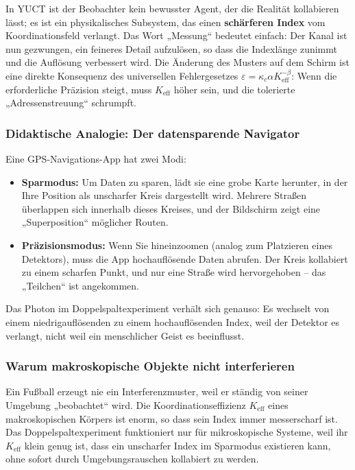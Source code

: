 \documentclass[12pt,a4paper]{article}
\theoremstyle{remark}
\begin{document}
	In YUCT ist der Beobachter kein bewusster Agent, der die Realität kollabieren lässt; es ist ein physikalisches Subsystem, das einen \textbf{schärferen Index} vom Koordinationsfeld verlangt. Das Wort „Messung“ bedeutet einfach: Der Kanal ist nun gezwungen, ein feineres Detail aufzulösen, so dass die Indexlänge zunimmt und die Auflösung verbessert wird. Die Änderung des Musters auf dem Schirm ist eine direkte Konsequenz des universellen Fehlergesetzes $\varepsilon = \kappa_c \alpha K_{\mathrm{eff}}^{-\beta}$: Wenn die erforderliche Präzision steigt, muss $K_{\mathrm{eff}}$ höher sein, und die tolerierte „Adressenstreuung“ schrumpft.
	
	\subsubsection{Didaktische Analogie: Der datensparende Navigator}
	
	Eine GPS-Navigations-App hat zwei Modi:
	\begin{itemize}
		\item \textbf{Sparmodus:} Um Daten zu sparen, lädt sie eine grobe Karte herunter, in der Ihre Position als unscharfer Kreis dargestellt wird. Mehrere Straßen überlappen sich innerhalb dieses Kreises, und der Bildschirm zeigt eine „Superposition“ möglicher Routen.
		\item \textbf{Präzisionsmodus:} Wenn Sie hineinzoomen (analog zum Platzieren eines Detektors), muss die App hochauflösende Daten abrufen. Der Kreis kollabiert zu einem scharfen Punkt, und nur eine Straße wird hervorgehoben – das „Teilchen“ ist angekommen.
	\end{itemize}
	Das Photon im Doppelspaltexperiment verhält sich genauso: Es wechselt von einem niedrigauflösenden zu einem hochauflösenden Index, weil der Detektor es verlangt, nicht weil ein menschlicher Geist es beeinflusst.
	
	\subsubsection{Warum makroskopische Objekte nicht interferieren}
	
	Ein Fußball erzeugt nie ein Interferenzmuster, weil er ständig von seiner Umgebung „beobachtet“ wird. Die Koordinationseffizienz $K_{\mathrm{eff}}$ eines makroskopischen Körpers ist enorm, so dass sein Index immer messerscharf ist. Das Doppelspaltexperiment funktioniert nur für mikroskopische Systeme, weil ihr $K_{\mathrm{eff}}$ klein genug ist, dass ein unscharfer Index im Sparmodus existieren kann, ohne sofort durch Umgebungsrauschen kollabiert zu werden.
	
\end{document}
